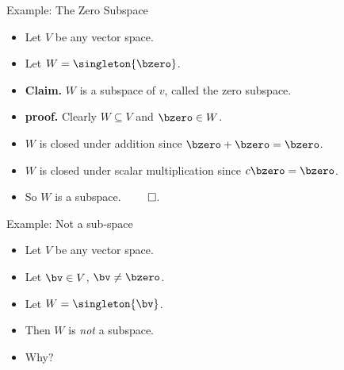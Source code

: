 \documentclass{beamer}
\begin{document}
\begin{frame}{Example: The Zero Subspace}

\begin{itemize}
\item Let $V$ be any vector space.
\item Let $W=\singleton{\bzero}$.
\item \textbf{Claim.} $W$ is a subspace of $v$, called the zero subspace.
\item \textbf{proof.} Clearly $W\subseteq V$ and $\bzero\in W$.
\item $W$ is closed under addition since $\bzero+\bzero=\bzero$.
\item $W$ is closed under scalar multiplication since $c\bzero=\bzero$.
\item So $W$ is a subspace. $\qed$.
\end{itemize}
\end{frame}

\begin{frame}{Example: Not a sub-space}

\begin{itemize}
\item Let $V$ be any vector space.
\item Let $\bv\in V$, $\bv\not=\bzero$.
\item Let $W=\singleton{\bv}$.
\item Then $W$ is \emph{not} a subspace.
\item Why?
\end{itemize}
\end{frame}
\end{document}
